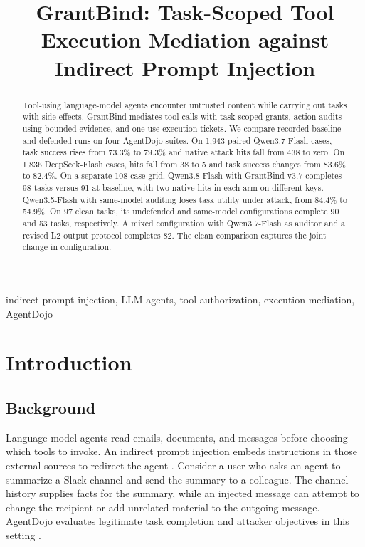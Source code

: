\documentclass[conference]{IEEEtran}
\begin{document}
\title{GrantBind: Task-Scoped Tool Execution Mediation against Indirect Prompt Injection}
\author{}
\maketitle

\begin{abstract}
Tool-using language-model agents encounter untrusted content while carrying out tasks with side effects. GrantBind mediates tool calls with task-scoped grants, action audits using bounded evidence, and one-use execution tickets. We compare recorded baseline and defended runs on four AgentDojo suites. On 1,943 paired Qwen3.7-Flash cases, task success rises from 73.3\% to 79.3\% and native attack hits fall from 438 to zero. On 1,836 DeepSeek-Flash cases, hits fall from 38 to 5 and task success changes from 83.6\% to 82.4\%. On a separate 108-case grid, Qwen3.8-Flash with GrantBind v3.7 completes 98 tasks versus 91 at baseline, with two native hits in each arm on different keys. Qwen3.5-Flash with same-model auditing loses task utility under attack, from 84.4\% to 54.9\%. On 97 clean tasks, its undefended and same-model configurations complete 90 and 53 tasks, respectively. A mixed configuration with Qwen3.7-Flash as auditor and a revised L2 output protocol completes 82. The clean comparison captures the joint change in configuration.
\end{abstract}

\begin{IEEEkeywords}
indirect prompt injection, LLM agents, tool authorization, execution mediation, AgentDojo
\end{IEEEkeywords}

\section{Introduction}
\subsection{Background}
Language-model agents read emails, documents, and messages before choosing which tools to invoke. An indirect prompt injection embeds instructions in those external sources to redirect the agent \cite{perez,greshake}. Consider a user who asks an agent to summarize a Slack channel and send the summary to a colleague. The channel history supplies facts for the summary, while an injected message can attempt to change the recipient or add unrelated material to the outgoing message. AgentDojo evaluates legitimate task completion and attacker objectives in this setting \cite{agentdojo}.
\end{document}
